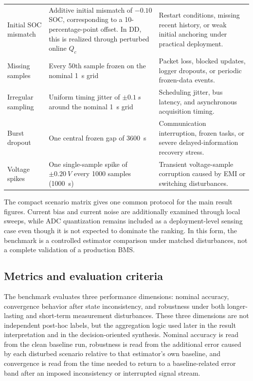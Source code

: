 \documentclass[
    a4paper,
    12pt,
    titlepage,
    bibliography=totoc,
    twoside=on,
    parskip=false,
    numbers=noenddot,
    cleardoublepage=empty,
    DIV=12,
    BCOR=12.0mm,
    headheight=36pt,
    headings=openright
]{scrreprt}
\begin{document}
\begin{longtable}{@{}>{\raggedright\arraybackslash}p{2.6cm}>{\raggedright\arraybackslash}p{5.6cm}>{\raggedright\arraybackslash}p{5.6cm}@{}}
Initial SOC mismatch & Additive initial mismatch of $-0.10$ SOC, corresponding to a 10-percentage-point offset. In DD, this is realized through perturbed online $Q_c$ & Restart conditions, missing recent history, or weak initial anchoring under practical deployment.\autocite{liRobustnessSOCEstimation2015,gaoEnhancedStateofchargeEstimation2022} \\
Missing samples & Every 50th sample frozen on the nominal \SI{1}{s} grid & Packet loss, blocked updates, logger dropouts, or periodic frozen-data events.\autocite{naseriReliableWirelessBMS2025,liuAssessingImpactSampling2025} \\
Irregular sampling & Uniform timing jitter of $\pm\SI{0.1}{s}$ around the nominal \SI{1}{s} grid & Scheduling jitter, bus latency, and asynchronous acquisition timing.\autocite{bergerBenchmarkingBatteryManagement2024,naseriReliableWirelessBMS2025,liuAssessingImpactSampling2025} \\
Burst dropout & One central frozen gap of \SI{3600}{s} & Communication interruption, frozen tasks, or severe delayed-information recovery stress.\autocite{bergerBenchmarkingBatteryManagement2024,naseriReliableWirelessBMS2025} \\
Voltage spikes & One single-sample spike of $\pm\SI{0.20}{V}$ every 1000 samples (\SI{1000}{s}) & Transient voltage-sample corruption caused by EMI or switching disturbances.\autocite{aielloElectromagneticSusceptibilityBattery2020} \\
\end{longtable}
\endgroup

The compact scenario matrix gives one common protocol for the main result figures. Current bias and current noise are additionally examined through local sweeps, while ADC quantization remains included as a deployment-level sensing case even though it is not expected to dominate the ranking. In this form, the benchmark is a controlled estimator comparison under matched disturbances, not a complete validation of a production BMS.

\subsection{Metrics and evaluation criteria}
\label{sec:robustness_metrics}
The benchmark evaluates three performance dimensions: nominal accuracy, convergence behavior after state inconsistency, and robustness under both longer-lasting and short-term measurement disturbances. These three dimensions are not independent post-hoc labels, but the aggregation logic used later in the result interpretation and in the decision-oriented synthesis. Nominal accuracy is read from the clean baseline run, robustness is read from the additional error caused by each disturbed scenario relative to that estimator's own baseline, and convergence is read from the time needed to return to a baseline-related error band after an imposed inconsistency or interrupted signal stream.
\end{document}
